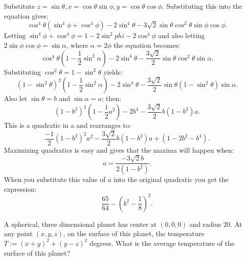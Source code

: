 \begin{solution}[name={Solution by WeakMathemetician}]
	Substitute $z=\sin\theta, x = \cos\theta \sin\phi, y = \cos\theta \cos\phi$. Substituting this into the equation gives:
	$$\cos^4 \theta(\sin^4\phi + \cos^4\phi) - 2\sin^4\theta - 3\sqrt{2} \sin\theta \cos^2 \theta \sin \phi \cos \phi.$$ Letting $\sin^4\phi + \cos^4\phi = 1-2\sin^2phi -2 \cos^4 \phi$ and also letting $2\sin \phi\cos \phi= \sin \alpha$, where $\alpha = 2\phi$ the equation becomes:
	$$\cos^4 \theta (1 - \frac{1}{2} \sin^2 \alpha) - 2\sin^4 \theta - \frac{3 \sqrt{2}}{2} \sin \theta \cos^2 \theta \sin \alpha.$$
	Substituting $\cos^2 \theta = 1- \sin^2 \theta$ yields:
	$$(1-\sin^2 \theta)^2(1- \frac{1}{2} \sin^2 \alpha) - 2 \sin^4 \theta - \frac{3 \sqrt{2}}{2} \sin \theta (1- \sin^2 \theta) \sin \alpha.$$
	Also let $\sin \theta = b$ and $ \sin \alpha = a$; then:
	$$(1-b^2)^2(1- \frac{1}{2}a^2) - 2b^4 - \frac{3 \sqrt{2}}{2} b(1-b^2)a.$$
	This is a quadratic in a and rearranges to:
	$$\frac{-1}{2}(1-b^2)^2a^2 -\frac{3 \sqrt{2}}{2} b(1-b^2)a + (1-2b^2-b^4).$$ Maximizing quadratics is easy and gives that the maxima will happen when:
	$$a = \frac{-3\sqrt{2}b}{2(1-b^2)}.$$ When you substitute this value of $a$ into the original quadratic you get the expression:
	$$\frac{65}{64} - (b^2- \frac{1}{8})^2.$$
\end{solution}



\begin{question} 
	A spherical, three dimensional planet has center at $(0,0,0)$ and radius $20$. At any point $(x,y,z)$, on the surface of this planet, the temperature $T:=(x+y)^2+(y-z)^2$ degrees. What is the average temperature of the surface of this planet?
\end{question}


